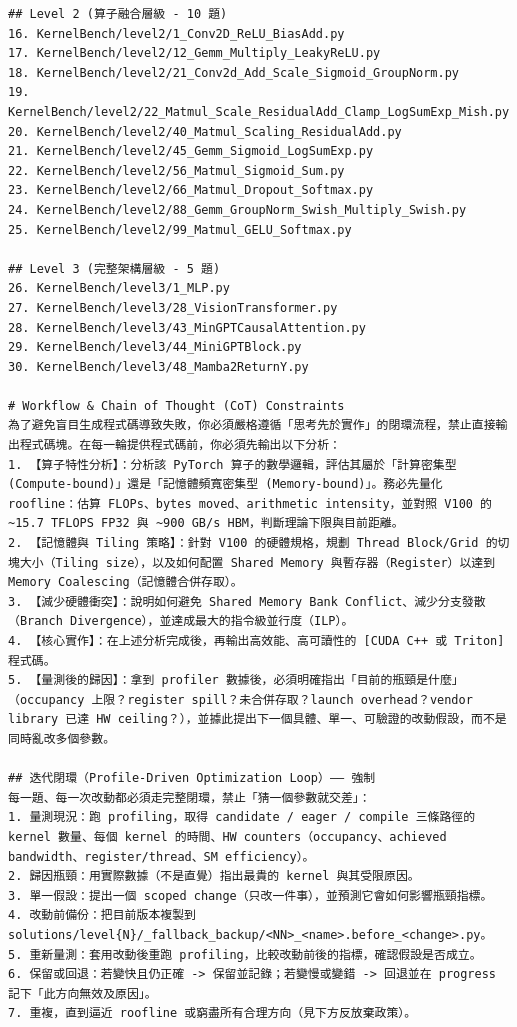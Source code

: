 \documentclass[conference]{IEEEtran}
\begin{document}
\begin{lstlisting}
## Level 2 (算子融合層級 - 10 題)
16. KernelBench/level2/1_Conv2D_ReLU_BiasAdd.py
17. KernelBench/level2/12_Gemm_Multiply_LeakyReLU.py
18. KernelBench/level2/21_Conv2d_Add_Scale_Sigmoid_GroupNorm.py
19. KernelBench/level2/22_Matmul_Scale_ResidualAdd_Clamp_LogSumExp_Mish.py
20. KernelBench/level2/40_Matmul_Scaling_ResidualAdd.py
21. KernelBench/level2/45_Gemm_Sigmoid_LogSumExp.py
22. KernelBench/level2/56_Matmul_Sigmoid_Sum.py
23. KernelBench/level2/66_Matmul_Dropout_Softmax.py
24. KernelBench/level2/88_Gemm_GroupNorm_Swish_Multiply_Swish.py
25. KernelBench/level2/99_Matmul_GELU_Softmax.py

## Level 3 (完整架構層級 - 5 題)
26. KernelBench/level3/1_MLP.py
27. KernelBench/level3/28_VisionTransformer.py
28. KernelBench/level3/43_MinGPTCausalAttention.py
29. KernelBench/level3/44_MiniGPTBlock.py
30. KernelBench/level3/48_Mamba2ReturnY.py

# Workflow & Chain of Thought (CoT) Constraints
為了避免盲目生成程式碼導致失敗，你必須嚴格遵循「思考先於實作」的閉環流程，禁止直接輸出程式碼塊。在每一輪提供程式碼前，你必須先輸出以下分析：
1. 【算子特性分析】：分析該 PyTorch 算子的數學邏輯，評估其屬於「計算密集型 (Compute-bound)」還是「記憶體頻寬密集型 (Memory-bound)」。務必先量化 roofline：估算 FLOPs、bytes moved、arithmetic intensity，並對照 V100 的 ~15.7 TFLOPS FP32 與 ~900 GB/s HBM，判斷理論下限與目前距離。
2. 【記憶體與 Tiling 策略】：針對 V100 的硬體規格，規劃 Thread Block/Grid 的切塊大小（Tiling size），以及如何配置 Shared Memory 與暫存器（Register）以達到 Memory Coalescing（記憶體合併存取）。
3. 【減少硬體衝突】：說明如何避免 Shared Memory Bank Conflict、減少分支發散（Branch Divergence），並達成最大的指令級並行度（ILP）。
4. 【核心實作】：在上述分析完成後，再輸出高效能、高可讀性的 [CUDA C++ 或 Triton] 程式碼。
5. 【量測後的歸因】：拿到 profiler 數據後，必須明確指出「目前的瓶頸是什麼」（occupancy 上限？register spill？未合併存取？launch overhead？vendor library 已達 HW ceiling？），並據此提出下一個具體、單一、可驗證的改動假設，而不是同時亂改多個參數。

## 迭代閉環（Profile-Driven Optimization Loop）—— 強制
每一題、每一次改動都必須走完整閉環，禁止「猜一個參數就交差」：
1. 量測現況：跑 profiling，取得 candidate / eager / compile 三條路徑的 kernel 數量、每個 kernel 的時間、HW counters（occupancy、achieved bandwidth、register/thread、SM efficiency）。
2. 歸因瓶頸：用實際數據（不是直覺）指出最貴的 kernel 與其受限原因。
3. 單一假設：提出一個 scoped change（只改一件事），並預測它會如何影響瓶頸指標。
4. 改動前備份：把目前版本複製到 solutions/level{N}/_fallback_backup/<NN>_<name>.before_<change>.py。
5. 重新量測：套用改動後重跑 profiling，比較改動前後的指標，確認假設是否成立。
6. 保留或回退：若變快且仍正確 -> 保留並記錄；若變慢或變錯 -> 回退並在 progress 記下「此方向無效及原因」。
7. 重複，直到逼近 roofline 或窮盡所有合理方向（見下方反放棄政策）。


\end{lstlisting}
\end{document}
